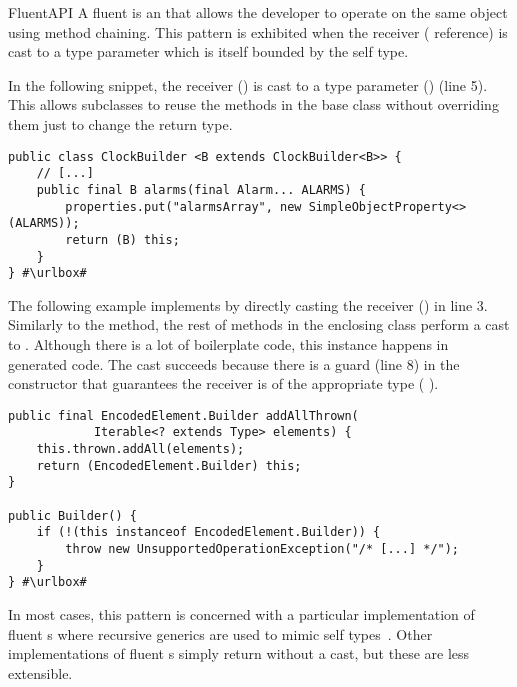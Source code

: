 \begin{pattern}{FluentAPI}
A fluent \api{} is an \api{} that allows the developer to operate on the same
object using method chaining.
This pattern is exhibited when the receiver ( reference) is cast to a type parameter which is itself bounded by the self type.


\instances{}
In the following snippet,
the receiver () is cast to a type parameter () (line 5).
This allows subclasses to reuse the methods in the base class without overriding them just to change the return type.

\def\urlvar{http://bit.ly/HanSolo_Medusa_2TyBObH}
\begin{verbatim}
public class ClockBuilder <B extends ClockBuilder<B>> {
    // [...]
    public final B alarms(final Alarm... ALARMS) {
        properties.put("alarmsArray", new SimpleObjectProperty<>(ALARMS));
        return (B) this;
    }
} #\urlbox#
\end{verbatim}

The following example implements \thisp{} by directly casting the receiver
() in line 3.
Similarly to the  method,
the rest of methods in the enclosing class perform a cast to .
Although there is a lot of boilerplate code,
this instance happens in generated code.
The cast succeeds because there is a guard (line 8) in the constructor that 
guarantees the receiver is of the appropriate type (\cf{} ).

\def\urlvar{http://bit.ly/immutables_immutables_2S4BoJs}
\begin{verbatim}
public final EncodedElement.Builder addAllThrown(
            Iterable<? extends Type> elements) {
    this.thrown.addAll(elements);
    return (EncodedElement.Builder) this;
}

public Builder() {
    if (!(this instanceof EncodedElement.Builder)) {
        throw new UnsupportedOperationException("/* [...] */");
    }
} #\urlbox#
\end{verbatim}


\issues{}
In most cases,
this pattern is concerned with a particular implementation of fluent \api{}s
where recursive generics are used to mimic self types~\citep{bruceChallengingTypingIssues2003}.
Other implementations of fluent \api{}s simply return  without a cast, but these are less extensible.

\end{pattern}
